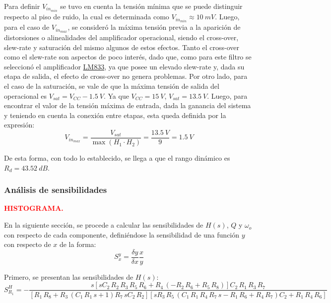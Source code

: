 Para definir $V_{in_{min}}$ se tuvo en cuenta la tensión mínima que se puede distinguir respecto al piso de ruido, la cual es determinada como $V_{in_{min}} \approx 10 \ mV$. Luego, para el caso de $V_{in_{max}}$, se consideró la máxima tensión previa a la aparición de distorsiones o alinealidades del amplificador operacional, siendo el cross-over, slew-rate y saturación del mismo algunos de estos efectos. Tanto el cross-over como el slew-rate son aspectos de poco interés, dado que, como para este filtro se seleccionó el amplificador \href{http://www.ti.com/lit/ds/symlink/lm833-n.pdf}{LM833}, ya que posee un elevado slew-rate y, dada su etapa de salida, el efecto de cross-over no genera problemas. Por otro lado, para el caso de la saturación, se vale de que la máxima tensión de salida del operacional es $V_{sat} = V_{CC} - 1.5 \ V$. Ya que $V_{CC} = 15 \ V$, $V_{sat} = 13.5 \ V$. Luego, para encontrar el valor de la tensión máxima de entrada, dada la ganancia del sistema y teniendo en cuenta la conexión entre etapas, esta queda definida por la expresión:
\begin{equation}
	V_{in_{max}}=\frac{V_{sat}}{  \max(H_{1} \cdot H_{2} )} = \frac{13.5 \ V}{9} = 1.5 \ V
\end{equation}

De esta forma, con todo lo establecido, se llega a que el rango dinámico es $R_d = 43.52 \ dB$.

\subsubsection{Análisis de sensibilidades}
\begin{center}
	\Large{\textbf{\textcolor{red}{HISTOGRAMA.}}}
\end{center}

En la siguiente sección, se procede a calcular las sensibilidades de $H(s)$, $Q$ y $\omega_o$ con respecto de cada componente, definiéndose la sensibilidad de una función $y$ con respecto de $x$ de la forma:
\begin{equation*}
	S_{x}^{y} = \frac{\delta y}{\delta x} \frac{x}{y}
\end{equation*}

Primero, se presentan las sensibilidades de $H\left(s \right)$:
\begin{equation}
S_{R_1}^{H} = -{\frac {s \left[ s{C_2}\,{R_2}\,{R_3}\,{R_5}\,{R_6}+{
R_4}\, \left( -{R_2}\,{R_6}+{R_5}\,{R_8} \right) 
 \right] {C_2}\,{R_1}\,{R_3}\,{R_7}}{ \left[ {R_1}\,{
R_8}+{R_3}\, \left( {C_1}\,{R_1}\,s+1 \right) {R_7}\,s{
C_2}\,{R_2} \right]  \left[ s{R_3}\,{R_5}\, \left( {C_1
}\,{R_1}\,{R_4}\,{R_7}\,s-{R_1}\,{R_6}+{R_4}\,{R_7} \right) {C_2}+{R_1}\,{R_4}\,{R_6} \right] }}
\end{equation}

